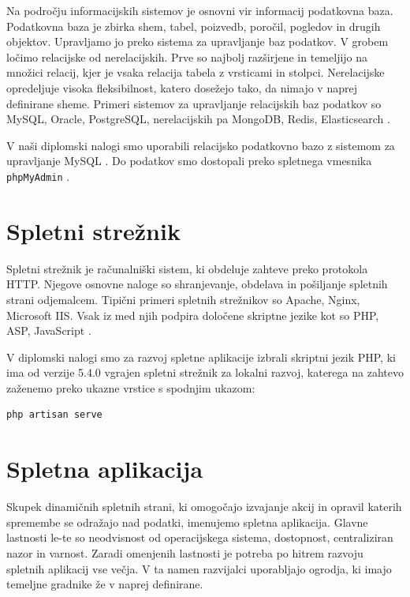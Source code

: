 \documentclass[a4paper, 12pt]{book}
\begin{document}
Na področju informacijskih sistemov je osnovni vir informacij podatkovna baza. Podatkovna baza je zbirka shem, tabel, poizvedb, poročil, pogledov in drugih objektov. Upravljamo jo preko sistema za upravljanje baz podatkov. V grobem ločimo relacijske od nerelacijskih. Prve so najbolj razširjene in temeljijo na množici relacij, kjer je vsaka relacija tabela z vrsticami in stolpci. Nerelacijske opredeljuje visoka fleksibilnost, katero dosežejo tako, da nimajo v naprej definirane sheme.
Primeri sistemov za upravljanje relacijskih baz podatkov so MySQL, Oracle, PostgreSQL, nerelacijskih pa MongoDB, Redis, Elasticsearch \cite{podatkovne-baze}.

V naši diplomski nalogi smo uporabili relacijsko podatkovno bazo z sistemom za upravljanje MySQL \cite{mysql-baza}. Do podatkov smo dostopali preko spletnega vmesnika \verb=phpMyAdmin= \cite{phpmyadmin-framework}.

\section{Spletni strežnik}

Spletni strežnik je računalniški sistem, ki obdeluje zahteve preko protokola HTTP.
Njegove osnovne naloge so shranjevanje, obdelava in pošiljanje spletnih strani odjemalcem. Tipični primeri spletnih strežnikov so Apache, Nginx, Microsoft IIS. Vsak iz med njih podpira določene skriptne jezike kot so PHP, ASP, JavaScript \cite{spletni-strezniki}.

V diplomski nalogi smo za razvoj spletne aplikacije izbrali skriptni jezik PHP, ki ima od verzije 5.4.0 vgrajen spletni strežnik za lokalni razvoj, katerega na zahtevo zaženemo preko ukazne vrstice s spodnjim ukazom: 

\begin{verbatim}
php artisan serve
\end{verbatim}

\section{Spletna aplikacija}

Skupek dinamičnih spletnih strani, ki omogočajo izvajanje akcij in opravil katerih spremembe se odražajo nad podatki, imenujemo spletna aplikacija. Glavne lastnosti le-te so neodvisnost od operacijskega sistema, dostopnost, centraliziran nazor in varnost. Zaradi omenjenih lastnosti je potreba po hitrem razvoju spletnih aplikacij vse večja. V ta namen razvijalci uporabljajo ogrodja, ki imajo temeljne gradnike že v naprej definirane.
\end{document}
